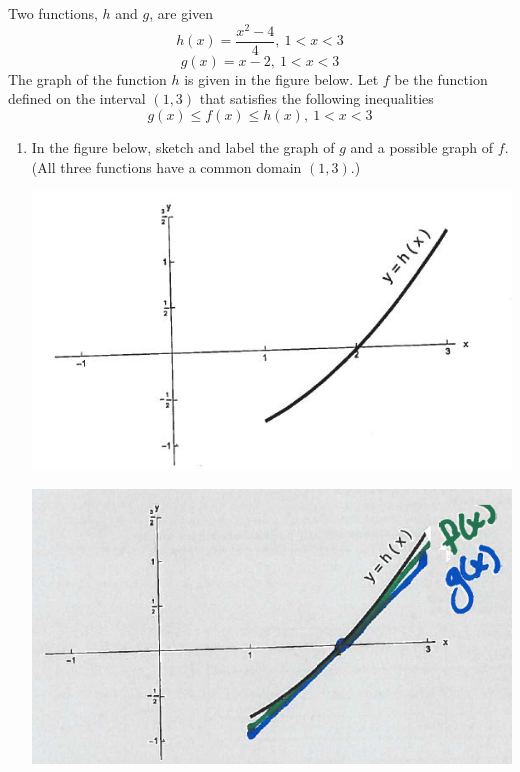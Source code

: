 \documentclass[nooutcomes,handout]{ximera}
\begin{document}
\begin{problem}
	Two functions, $h$ and $g$, are given
	\[
	h(x)=\frac{x^2-4}{4},\  1 <x < 3
	\]
	\[
	g(x)=x-2,\  1 < x < 3
	\]
The graph of the function $h$ is given in the figure below.  
Let $f$ be the function defined on the interval $(1,3)$ that satisfies the following inequalities
	\[
	g(x) \le f(x) \le h(x),\ 1 < x < 3
	\]

	\begin{enumerate}
	
	\item In the figure below, sketch and label the graph of $g$ and a possible graph of $f$.  (All three functions have a common domain $(1,3)$.)

	\begin{image}
	\includegraphics{Figure1}
	\end{image}
	
	\begin{freeResponse}	
	\begin{image}
	\includegraphics{Figure2}
	\end{image}
	\end{freeResponse}


\end{enumerate}
\end{problem}
\end{document}
